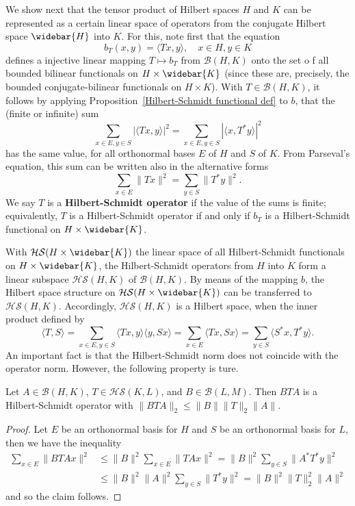 We show next that the tensor product of Hilbert spaces $H$ and $K$ can be represented as a certain linear space of operators from the conjugate Hilbert space $\widebar{H}$ into $K$. For this, note first that the equation
\[b_T(x,y)=\langle Tx,y\rangle,\quad x\in H,y\in K\]
defines a injective linear mapping $T\mapsto b_T$ from $\mathcal{B}(H,K)$ onto the set o f all bounded bilinear functionals on $H\times\widebar{K}$ (since these are, precisely, the bounded conjugate-bilinear functionals on $H\times K$). With $T\in\mathcal{B}(H,K)$, it follows by applying Proposition~\ref{Hilbert-Schmidt functional def} to $b$, that the (finite or infinite) sum
\[\sum_{x\in E,y\in S}|\langle Tx,y\rangle|^2=\sum_{x\in E,y\in S}|\langle x,T^*y\rangle|^2\]
has the same value, for all orthonormal bases $E$ of $H$ and $S$ of $K$. From Parseval's equation, this sum can be written also in the alternative forms
\[\sum_{x\in E}\|Tx\|^2=\sum_{y\in S}\|T^*y\|^2.\]
We say $T$ is a \textbf{Hilbert-Schmidt operator} if the value of the sums is finite; equivalently, $T$ is a Hilbert-Schmidt operator if and only if $b_T$ is a Hilbert-Schmidt functional on $H\times\widebar{K}$.\par
With $\mathcal{HS}(H\times\widebar{K})$ the linear space of all Hilbert-Schmidt functionals on $H\times\widebar{K}$, the Hilbert-Schmidt operators from $H$ into $K$ form a linear subspace $\mathcal{HS}(H,K)$ of $\mathcal{B}(H,K)$. By means of the mapping $b$, the Hilbert space structure on $\mathcal{HS}(H\times\widebar{K})$ can be transferred to $\mathcal{HS}(H,K)$. Accordingly, $\mathcal{HS}(H,K)$ is a Hilbert space, when the inner product defined by
\[\langle T,S\rangle=\sum_{x\in E,y\in S}\langle Tx,y\rangle\langle y,Sx\rangle=\sum_{x\in E}\langle Tx,Sx\rangle=\sum_{y\in S}\langle S^*x,T^*y\rangle.\]
An important fact is that the Hilbert-Schmidt norm does not coincide with the operator norm. However, the following property is ture.
\begin{proposition}\label{Hilbert-Schmidt operator ideal prop}
Let $A\in\mathcal{B}(H,K)$, $T\in\mathcal{HS}(K,L)$, and $B\in\mathcal{B}(L,M)$. Then $BTA$ is a Hilbert-Schmidt operator with $\|BTA\|_2\leq\|B\|\|T\|_2\|A\|$.
\end{proposition}
\begin{proof}
Let $E$ be an orthonormal basis for $H$ and $S$ be an orthonormal basis for $L$, then we have the inequality
\begin{align*}
\sum_{x\in E}\|BTAx\|^2&\leq\|B\|^2\sum_{x\in E}\|TAx\|^2=\|B\|^2\sum_{y\in S}\|A^*T^*y\|^2\\
&\leq\|B\|^2\|A\|^2\sum_{y\in S}\|T^*y\|^2=\|B\|^2\|T\|_2^2\|A\|^2
\end{align*}
and so the claim follows.
\end{proof}
